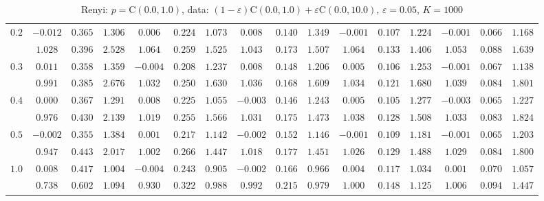 \begin{table}[htb]
\begin{center}
\begin{tabular}{|c|ccc|ccc|ccc|ccc|ccc|}
\hline 
$0.2$ & $ -0.012 $ & $ 0.365 $ & $ 1.306 $ & $ 0.006 $ & $ 0.224 $ & $ 1.073 $ & $ 0.008 $ & $ 0.140 $ & $ 1.349 $ & $ -0.001 $ & $ 0.107 $ & $ 1.224 $ & $ -0.001 $ & $ 0.066 $ & $ 1.168 $\\ 
 & $ 1.028 $ & $ 0.396 $ & $ 2.528 $ & $ 1.064 $ & $ 0.259 $ & $ 1.525 $ & $ 1.043 $ & $ 0.173 $ & $ 1.507 $ & $ 1.064 $ & $ 0.133 $ & $ 1.406 $ & $ 1.053 $ & $ 0.088 $ & $ 1.639 $\\ 
\hline 
$0.3$ & $ 0.011 $ & $ 0.358 $ & $ 1.359 $ & $ -0.004 $ & $ 0.208 $ & $ 1.237 $ & $ 0.008 $ & $ 0.148 $ & $ 1.206 $ & $ 0.005 $ & $ 0.106 $ & $ 1.253 $ & $ -0.001 $ & $ 0.067 $ & $ 1.138 $\\ 
 & $ 0.991 $ & $ 0.385 $ & $ 2.676 $ & $ 1.032 $ & $ 0.250 $ & $ 1.630 $ & $ 1.036 $ & $ 0.168 $ & $ 1.609 $ & $ 1.034 $ & $ 0.121 $ & $ 1.680 $ & $ 1.039 $ & $ 0.084 $ & $ 1.801 $\\ 
\hline 
$0.4$ & $ 0.000 $ & $ 0.367 $ & $ 1.291 $ & $ 0.008 $ & $ 0.225 $ & $ 1.055 $ & $ -0.003 $ & $ 0.146 $ & $ 1.243 $ & $ 0.005 $ & $ 0.105 $ & $ 1.277 $ & $ -0.003 $ & $ 0.065 $ & $ 1.227 $\\ 
 & $ 0.976 $ & $ 0.430 $ & $ 2.139 $ & $ 1.019 $ & $ 0.255 $ & $ 1.566 $ & $ 1.031 $ & $ 0.175 $ & $ 1.473 $ & $ 1.038 $ & $ 0.128 $ & $ 1.508 $ & $ 1.033 $ & $ 0.083 $ & $ 1.824 $\\ 
\hline 
$0.5$ & $ -0.002 $ & $ 0.355 $ & $ 1.384 $ & $ 0.001 $ & $ 0.217 $ & $ 1.142 $ & $ -0.002 $ & $ 0.152 $ & $ 1.146 $ & $ -0.001 $ & $ 0.109 $ & $ 1.181 $ & $ -0.001 $ & $ 0.065 $ & $ 1.203 $\\ 
 & $ 0.947 $ & $ 0.443 $ & $ 2.017 $ & $ 1.002 $ & $ 0.266 $ & $ 1.447 $ & $ 1.018 $ & $ 0.177 $ & $ 1.451 $ & $ 1.026 $ & $ 0.129 $ & $ 1.488 $ & $ 1.029 $ & $ 0.084 $ & $ 1.800 $\\ 
\hline 
$1.0$ & $ 0.008 $ & $ 0.417 $ & $ 1.004 $ & $ -0.004 $ & $ 0.243 $ & $ 0.905 $ & $ -0.002 $ & $ 0.166 $ & $ 0.966 $ & $ 0.004 $ & $ 0.117 $ & $ 1.034 $ & $ 0.001 $ & $ 0.070 $ & $ 1.057 $\\ 
 & $ 0.738 $ & $ 0.602 $ & $ 1.094 $ & $ 0.930 $ & $ 0.322 $ & $ 0.988 $ & $ 0.992 $ & $ 0.215 $ & $ 0.979 $ & $ 1.000 $ & $ 0.148 $ & $ 1.125 $ & $ 1.006 $ & $ 0.094 $ & $ 1.447 $\\ 
\hline 
\end{tabular}
\caption{Renyi: $p = \mathrm{C}(0.0,1.0)$, data: $(1-\varepsilon)\mathrm{C}(0.0,1.0) + \varepsilon \mathrm{C}(0.0,10.0)$, $\varepsilon =  0.05$, $K = 1000$} 
\end{center}
\end{table}

